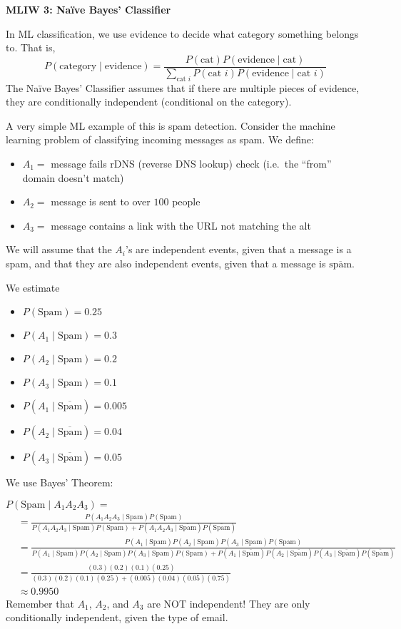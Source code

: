 \textbf{MLIW 3: Naïve Bayes' Classifier}

In ML classification, we use evidence to decide what category something
belongs to. That is,
\[ P(\text{category}\mid\text{evidence})
    =\frac{P(\text{cat})P(\text{evidence}\mid\text{cat})}
    {\sum\limits_{\text{cat }i} P(\text{cat }i)P(\text{evidence}\mid\text{cat }i)} \]
The Naïve Bayes' Classifier  assumes that if there are multiple pieces of evidence,
they are conditionally independent (conditional on the category).

A very simple ML example of this is spam detection. Consider the machine
learning problem of classifying incoming messages as spam. We define:
\begin{itemize}
    \item $ A_1= $ message fails rDNS (reverse DNS lookup) check (i.e.\ the ``from'' domain doesn't match)
    \item $ A_2= $ message is sent to over $ 100 $ people
    \item $ A_3= $ message contains a link with the URL not matching the alt
\end{itemize}

We will assume that the $ A_i $'s are independent events, given that a message
is a spam, and that they are also independent events, given that a message is
$ \overline{\text{spam}} $.

We estimate
\begin{itemize}
    \item $ P(\text{Spam})=0.25 $
    \item $ P(A_1\mid \text{Spam})=0.3$
    \item $ P(A_2\mid \text{Spam})=0.2$
    \item $ P(A_3\mid \text{Spam})=0.1$
    \item $ P(A_1\mid \overline{\text{Spam}})=0.005$
    \item $ P(A_2\mid \overline{\text{Spam}})=0.04$
    \item $ P(A_3\mid \overline{\text{Spam}})=0.05$
\end{itemize}
We use Bayes' Theorem:

$ P(\text{Spam}\mid A_1A_2A_3)= $
\begin{align*}
     & =\frac{P(A_1A_2A_3\mid\text{Spam})P(\text{Spam})}
    {P(A_1A_2A_3\mid\text{Spam})P(\text{Spam})+
    P(A_1A_2A_3\mid\overline{\text{Spam}})P(\overline{\text{Spam}})}                                                             \\
     & =\frac{P(A_1\mid\text{Spam}) P(A_2\mid\text{Spam}) P(A_3\mid\text{Spam}) P(\text{Spam})}
    {P(A_1\mid\text{Spam}) P(A_2\mid\text{Spam}) P(A_3\mid\text{Spam})P(\text{Spam})+
    P(A_1\mid\overline{\text{Spam}}) P(A_2\mid\overline{\text{Spam}}) P(A_3\mid\overline{\text{Spam}})P(\overline{\text{Spam}})} \\
     & =\frac{(0.3)(0.2)(0.1)(0.25)}{(0.3)(0.2)(0.1)(0.25)+(0.005)(0.04)(0.05)(0.75)}                                            \\
     & \approx 0.9950
\end{align*}
Remember that $ A_1 $, $ A_2 $, and $ A_3 $ are NOT independent!
They are only conditionally independent, given the type of email.

